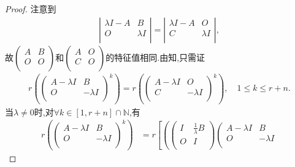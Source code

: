\documentclass[../../main.tex]{subfiles}%
\begin{document}
\begin{proof}
注意到
\begin{align*}
\left| \begin{matrix}
\lambda I-A&	B\\
O&	\lambda I\\
\end{matrix} \right|=\left| \begin{matrix}
\lambda I-A&	O\\
C&	\lambda I\\
\end{matrix} \right|,
\end{align*}
故$\left( \begin{matrix}
A&	B\\
O&	O\\
\end{matrix} \right)$和$\left( \begin{matrix}
A&	O\\
C&	O\\
\end{matrix} \right)$的特征值相同.由知,只需证
\begin{align*}
r\left( \left( \begin{matrix}
A-\lambda I&	B\\
O&	-\lambda I\\
\end{matrix} \right) ^k \right) =r\left( \left( \begin{matrix}
A-\lambda I&	O\\
C&	-\lambda I\\
\end{matrix} \right) ^k \right) ,\quad 1\leqslant k\leqslant r+n.
\end{align*}
当$\lambda \ne 0$时,对$\forall k\in \left[ 1,r+n \right] \cap \mathbb{N}$,有
\begin{align*}
r\left( \left( \begin{matrix}
A-\lambda I&	B\\
O&	-\lambda I\\
\end{matrix} \right) ^k \right) &=r\left[ \left( \left( \begin{matrix}
I&	\frac{1}{\lambda}B\\
O&	I\\
\end{matrix} \right) \left( \begin{matrix}
A-\lambda I&	B\\
O&	-\lambda I\\

\end{matrix}
\end{align*}
\end{proof}
\end{document}
